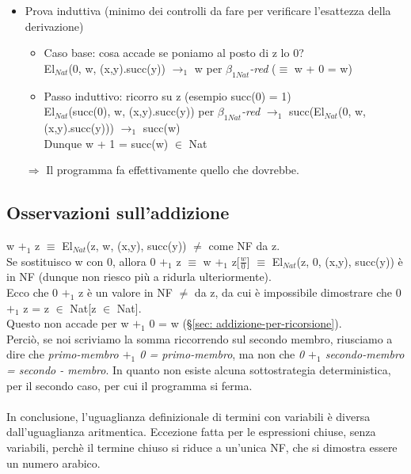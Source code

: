 \noindent
\normalsize
\begin{itemize}
\item Prova induttiva (minimo dei controlli da fare per verificare l'esattezza della derivazione)
\begin{itemize}
\item Caso base: cosa accade se poniamo al posto di z lo 0?\\
El$_{Nat}$(0, w, (x,y).succ(y)) $\rightarrow_1$ w per \textit{$\beta_{1Nat}$-red} ($\equiv$ w + 0 = w)
\item Passo induttivo: ricorro su z (esempio succ(0) = 1)\\
El$_{Nat}$(succ(0), w, (x,y).succ(y)) per \textit{$\beta_{1Nat}$-red} $\rightarrow_1$ succ(El$_{Nat}$(0, w, (x,y).succ(y))) $\rightarrow_1$ succ(w) \\
Dunque w + 1 = succ(w) $\in$ Nat
\end{itemize}
\noindent
$\Rightarrow$ Il programma fa effettivamente quello che dovrebbe.
\end{itemize}

\subsection{Osservazioni sull'addizione}
\label{subsec: osservazioni-addizione}
w $+_1$ z $\equiv$ El$_{Nat}$(z, w, (x,y), succ(y)) $\neq$ come NF da z.\\
Se sostituisco w con 0, allora 0 $+_1$ z $\equiv$ w $+_1$ z[$\frac{w}{0}$] $\equiv$ El$_{Nat}$(z, 0, (x,y), succ(y)) \`e in NF (dunque non riesco pi\`u a ridurla ulteriormente). 
\\Ecco che 0 $+_1$ z \`e un valore in NF $\neq$ da z, da cui \`e impossibile dimostrare che 0 $+_1$ z = z $\in$ Nat[z $\in$ Nat].\\
Questo non accade per w $+_1$ 0 = w (\S \ref{sec: addizione-per-ricorsione}).\\ 
Perci\`o, se noi scriviamo la somma riccorrendo sul secondo membro, riusciamo a dire che \textit{primo-membro $+_1$ 0 = primo-membro}, ma non che \textit{0 $+_1$ secondo-membro = secondo - membro}. In quanto non esiste alcuna sottostrategia deterministica, per il secondo caso, per cui il programma si ferma.
\\\\
In conclusione, l'uguaglianza definizionale di termini con variabili \`e diversa dall'uguaglianza aritmentica. Eccezione fatta per le espressioni chiuse, senza variabili, perch\`e il termine chiuso si riduce a un'unica NF, che si dimostra essere un numero arabico.


